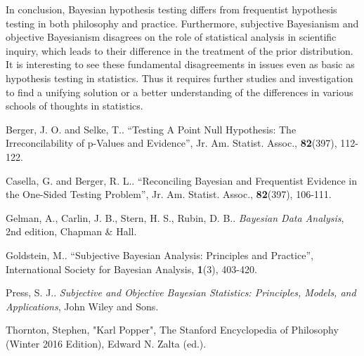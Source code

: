 \documentclass[12pt]{article} \usepackage[nolists]{endfloat}
\begin{document}
In conclusion, Bayesian hypothesis testing differs from frequentist hypothesis testing in both philosophy and practice. Furthermore, subjective Bayesianism and objective Bayesianism disagrees on the role of statistical analysis in scientific inquiry, which leads to their difference in the treatment of the prior distribution. It is interesting to see these fundamental disagreements in issues even as basic as hypothesis testing in statistics. Thus it requires further studies and investigation to find a unifying solution or a better understanding of the differences in various schools of thoughts in statistics.








\vspace{0.5in}

\begin{thebibliography}{}

 Berger, J. O. and Selke, T.. ``Testing A Point Null Hypothesis: The Irreconcilability of p-Values and Evidence'', Jr. Am. Statist. Assoc., {\bf 82}(397), 112-122.

 Casella, G. and Berger, R. L.. ``Reconciling Bayesian and Frequentist Evidence in the One-Sided Testing Problem'', Jr. Am. Statist. Assoc., {\bf 82}(397), 106-111.
  
 Gelman, A., Carlin, J. B., Stern, H. S., Rubin, D. B.. {\it Bayesian Data Analysis}, 2nd edition, Chapman \& Hall.

 Goldstein, M.. ``Subjective Bayesian Analysis: Principles and Practice'', International Society for Bayesian Analysis, {\bf1}(3), 403-420.

 Press, S. J.. {\it Subjective and Objective Bayesian Statistics: Principles, Models, and Applications}, John Wiley and Sons.

 \newblock Thornton, Stephen, "Karl
  Popper", The Stanford Encyclopedia of Philosophy (Winter 2016
  Edition), Edward N. Zalta (ed.).
\end{thebibliography}
\end{document}
